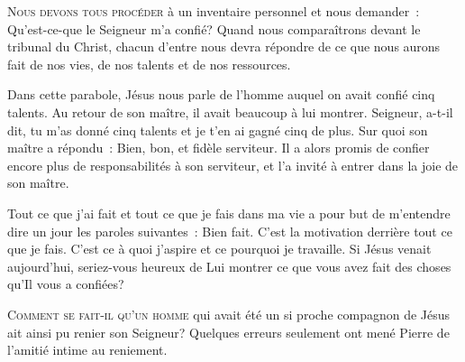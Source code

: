 \lettrine{N}{ous devons tous procéder} à un inventaire personnel
 et nous demander~: 
 \og Qu'est-ce-que le Seigneur m'a confié? \fg{}
 Quand nous comparaîtrons devant le tribunal du Christ,
 chacun d'entre nous devra répondre de ce que nous aurons fait de nos vies,
 de nos talents et de nos ressources. 


Dans cette parabole, Jésus nous parle de l'homme auquel on avait confié
 cinq talents. Au retour de son maître, il avait beaucoup à lui montrer.
 \og Seigneur, a-t-il dit, 
 tu m'as donné cinq talents et je t'en ai gagné cinq de plus. \fg{}
 Sur quoi son maître a répondu~: 
 \og Bien, bon, et fidèle serviteur. \fg{}
 Il a alors promis de confier encore plus de responsabilités à son serviteur,
 et l'a invité à entrer dans \og la joie de son maître. \fg{}

Tout ce que j'ai fait et tout ce que je fais dans ma vie
 a pour but de m'entendre dire un jour les paroles suivantes~: 
 \og Bien fait. \fg{} 
 C'est la motivation derrière tout ce que je fais.
 C'est ce à quoi j'aspire et ce pourquoi je travaille.
 Si Jésus venait aujourd'hui, seriez-vous heureux de Lui montrer
 ce que vous avez fait des choses qu'Il vous a confiées? 

\dvrule






\lettrine{C}{omment se fait-il qu'un homme} qui avait été un si proche
 compagnon de Jésus ait ainsi pu renier son Seigneur?
 Quelques erreurs seulement ont mené Pierre de l'amitié intime au reniement. 

